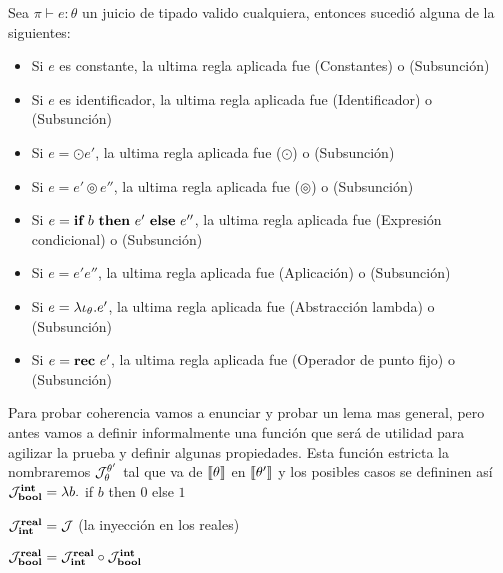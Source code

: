 \begin{lemma}[De inversi\'on]
Sea $\pi \vdash e : \theta$ un juicio de tipado valido cualquiera, entonces
sucedi\'o alguna de la siguientes:

\begin{itemize}
\item Si $e$ es constante, la ultima regla aplicada fue (Constantes) o (Subsunción)
\item Si $e$ es identificador, la ultima regla aplicada fue (Identificador) o (Subsunción)
\item Si $e = \odot e'$, la ultima regla aplicada fue ($\odot$) o (Subsunción)
\item Si $e = e' \circledcirc e''$, la ultima regla aplicada fue 
($\circledcirc$) o (Subsunción)
\item Si $e = \textbf{if} \ b \ \textbf{then} \ e' \ \textbf{else} \ e''$, la ultima regla aplicada fue 
(Expresi\'on condicional) o (Subsunción)
\item Si $e = e'e''$, la ultima regla aplicada fue (Aplicaci\'on) o (Subsunción)
\item Si $e = \lambda \iota_{\theta} . e'$, la ultima regla aplicada fue 
(Abstracci\'on lambda) o (Subsunción)
\item Si $e = \textbf{rec} \ e'$, la ultima regla aplicada fue (Operador de punto fijo) o (Subsunción)
\end{itemize}

\end{lemma}

Para probar coherencia vamos a enunciar y probar un lema mas general,
pero antes vamos a definir informalmente una 
funci\'on que ser\'a de utilidad para agilizar la prueba y definir algunas
propiedades. Esta funci\'on estricta la nombraremos $\mathcal{J}_{\theta}^{\theta'}$ tal que
va de $\llbracket \theta \rrbracket$ en $\llbracket \theta' \rrbracket$ y los posibles casos se defininen as\'i\\

$\mathcal{J}_{\textbf{bool}}^{\textbf{int}} = \lambda b .$ if $b$ then $0$ else $1$\\
\indent

$\mathcal{J}_{\textbf{int}}^{\textbf{real}} = \mathcal{J}$ (la inyecci\'on en los reales)\\
\indent

$\mathcal{J}_{\textbf{bool}}^{\textbf{real}} = \mathcal{J}_{\textbf{int}}^{\textbf{real}} \circ \mathcal{J}_{\textbf{bool}}^{\textbf{int}}$\\

